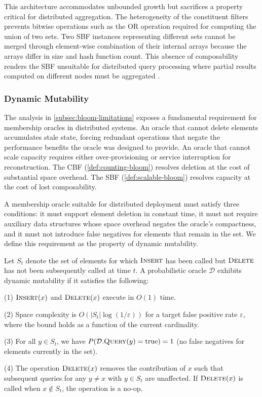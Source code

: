 This architecture accommodates unbounded growth but sacrifices a property critical for distributed aggregation. The heterogeneity of the constituent filters prevents bitwise operations such as the OR operation required for computing the union of two sets. Two SBF instances representing different sets cannot be merged through element-wise combination of their internal arrays because the arrays differ in size and hash function count. This absence of composability renders the SBF unsuitable for distributed query processing where partial results computed on different nodes must be aggregated \cite{Liu2014ParBFAP, Almeida2007ScalableBF}.

\subsubsection{Dynamic Mutability}

The analysis in \ref{subsec:bloom-limitations} exposes a fundamental requirement for membership oracles in distributed systems. An oracle that cannot delete elements accumulates stale state, forcing redundant operations that negate the performance benefits the oracle was designed to provide. An oracle that cannot scale capacity requires either over-provisioning or service interruption for reconstruction. The CBF (\ref{def:counting-bloom}) resolves deletion at the cost of substantial space overhead. The SBF (\ref{def:scalable-bloom}) resolves capacity at the cost of lost composability.

A membership oracle suitable for distributed deployment must satisfy three conditions: it must support element deletion in constant time, it must not require auxiliary data structures whose space overhead negates the oracle's compactness, and it must not introduce false negatives for elements that remain in the set. We define this requirement as the property of dynamic mutability.

\begin{definition} \label{def:mutability}
    Let $S_t$ denote the set of elements for which $\textsc{Insert}$ has been called but $\textsc{Delete}$ has not been subsequently called at time $t$. A probabilistic oracle $\mathcal{D}$ exhibits dynamic mutability if it satisfies the following:

    (1) $\textsc{Insert}(x)$ and $\textsc{Delete}(x)$ execute in $O(1)$ time.

    (2) Space complexity is $O(|S_t| \log(1/\varepsilon))$ for a target false positive rate $\varepsilon$, where the bound holds as a function of the current cardinality.

    (3) For all $y \in S_t$, we have $P(\mathcal{D}.\textsc{Query}(y) = \text{true}) = 1$ (no false negatives for elements currently in the set).

    (4) The operation $\textsc{Delete}(x)$ removes the contribution of $x$ such that subsequent queries for any $y \neq x$ with $y \in S_t$ are unaffected. If $\textsc{Delete}(x)$ is called when $x \notin S_t$, the operation is a no-op.
\end{definition}

